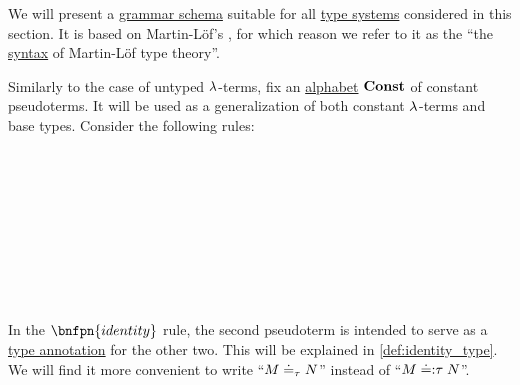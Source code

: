 \begin{definition}\label{def:mltt_pseudoterm}\mimprovised
  We will present a \hyperref[def:formal_grammar/schema]{grammar schema} suitable for all \hyperref[def:abstract_type_system]{type systems} considered in this section. It is based on Martin-L\"of's \cite{MartinLöf1984IntuitionisticTypeTheory}, for which reason we refer to it as the \enquote{the \hyperref[con:syntax_semantics_duality]{syntax} of Martin-L\"of type theory}.

  Similarly to the case of untyped \( {\mathrm \lambda} \)-terms, fix an \hyperref[def:formal_language/alphabet]{alphabet} \( \op*{Const} \) of constant pseudoterms. It will be used as a generalization of both constant \( {\mathrm \lambda} \)-terms and base types. Consider the following rules:

  \begin{bnf*}
               {} \\
                   { \bnfor {}} \\
     { \bnfsp \bnftsq{:} \bnfsp {}} \\
            {\bnftsq{\( ( \)} \bnfsp {} \bnfsp {} \bnfsp \bnftsq{\( ) \)}} \\
                 {\bnftsq{\( \synlambda \)} \bnfor \bnftsq{\( \synprod \)} \bnfor \bnftsq{\( \synsum \)}} \\
      {\bnftsq{\( ( \)} \bnfsp {} \bnfsp {} \bnfsp {} \bnfsp {} \bnfsp \bnftsq{\( ) \)}} \\
               {\bnftsq{\( ( \)} \bnfsp {} \bnfsp \bnftsq{\( \syneq \)} \bnfsp \bnftsq{\( : \)} \bnfsp {} \bnfsp {} \bnfsp \bnftsq{\( ) \)}} \\
             { \bnfor {}\bnfor {} \bnfor {} \bnfor} \\
  \end{bnf*}

  In the \( \bnfpn{identity} \) rule, the second pseudoterm is intended to serve as a \hyperref[con:type_annotation]{type annotation} for the other two. This will be explained in \cref{def:identity_type}. We will find it more convenient to write \enquote{\( M \doteq_\tau N \)} instead of \enquote{\( M \mathrel{{\doteq:} \tau} N \)}.


\end{definition}
